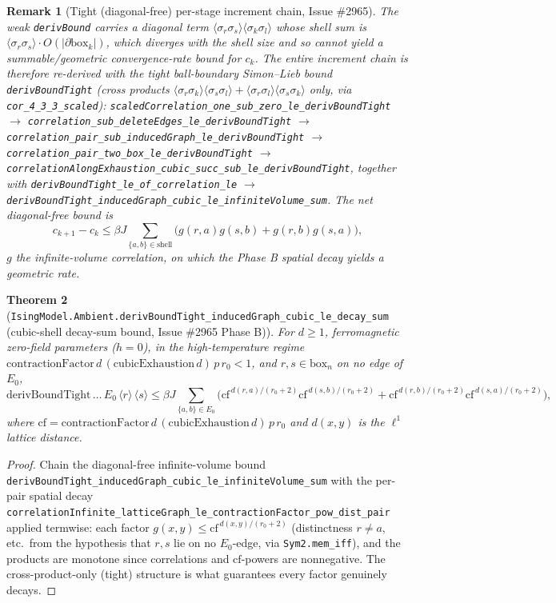 \documentclass[a4paper,11pt]{article}
\newtheorem{theorem}{Theorem}
\newtheorem{remark}[theorem]{Remark}
\begin{document}
\begin{remark}[Tight (diagonal-free) per-stage increment chain, Issue \#2965]
The weak \texttt{derivBound} carries a diagonal term
$\langle\sigma_r\sigma_s\rangle\langle\sigma_k\sigma_l\rangle$ whose shell sum is
$\langle\sigma_r\sigma_s\rangle\cdot O(|\partial\mathrm{box}_k|)$, which
\emph{diverges} with the shell size and so cannot yield a summable/geometric
convergence-rate bound for $c_k$. The entire increment chain is therefore
re-derived with the \emph{tight} ball-boundary
Simon--Lieb bound \texttt{derivBoundTight} (cross products
$\langle\sigma_r\sigma_k\rangle\langle\sigma_s\sigma_l\rangle
+\langle\sigma_r\sigma_l\rangle\langle\sigma_s\sigma_k\rangle$ only, via
\texttt{cor\_4\_3\_3\_scaled}):
\texttt{scaledCorrelation\_one\_sub\_zero\_le\_derivBoundTight}
$\to$ \texttt{correlation\_sub\_deleteEdges\_le\_derivBoundTight}
$\to$ \texttt{correlation\_pair\_sub\_inducedGraph\_le\_derivBoundTight}
$\to$ \texttt{correlation\_pair\_two\_box\_le\_derivBoundTight}
$\to$ \texttt{correlationAlongExhaustion\_cubic\_succ\_sub\_le\_derivBoundTight},
together with \texttt{derivBoundTight\_le\_of\_correlation\_le}
$\to$ \texttt{derivBoundTight\_inducedGraph\_cubic\_le\_infiniteVolume\_sum}. The
net diagonal-free bound is
\[
  c_{k+1}-c_k \le \beta J\sum_{\{a,b\}\in\text{shell}}
    \bigl(g(r,a)g(s,b)+g(r,b)g(s,a)\bigr),
\]
$g$ the infinite-volume correlation, on which the Phase B spatial decay yields a
geometric rate.
\end{remark}

\begin{theorem}[\texttt{IsingModel.Ambient.derivBoundTight\_inducedGraph\_cubic\_le\_decay\_sum}
(cubic-shell decay-sum bound, Issue \#2965 Phase B)]
For $d\ge1$, ferromagnetic zero-field parameters ($h=0$), in the
high-temperature regime
$\mathrm{contractionFactor}\,d\,(\mathrm{cubicExhaustion}\,d)\,p\,r_0<1$, and
$r,s\in\mathrm{box}_n$ on no edge of $E_0$,
\[
  \mathrm{derivBoundTight}\,\dots\,E_0\,\langle r\rangle\,\langle s\rangle
  \le \beta J\!\!\sum_{\{a,b\}\in E_0}\!\!\bigl(\mathrm{cf}^{\,d(r,a)/(r_0+2)}\mathrm{cf}^{\,d(s,b)/(r_0+2)}
    +\mathrm{cf}^{\,d(r,b)/(r_0+2)}\mathrm{cf}^{\,d(s,a)/(r_0+2)}\bigr),
\]
where $\mathrm{cf}=\mathrm{contractionFactor}\,d\,(\mathrm{cubicExhaustion}\,d)\,p\,r_0$
and $d(x,y)$ is the $\ell^1$ lattice distance.
\end{theorem}

\begin{proof}
Chain the diagonal-free infinite-volume bound
\texttt{derivBoundTight\_inducedGraph\_cubic\_le\_infiniteVolume\_sum} with the
per-pair spatial decay
\texttt{correlationInfinite\_latticeGraph\_le\_contractionFactor\_pow\_dist\_pair}
applied termwise: each factor $g(x,y)\le\mathrm{cf}^{\,d(x,y)/(r_0+2)}$ (distinctness
$r\neq a$, etc.\ from the hypothesis that $r,s$ lie on no $E_0$-edge, via
\texttt{Sym2.mem\_iff}), and the products are monotone since correlations and
$\mathrm{cf}$-powers are nonnegative. The cross-product-only (tight) structure is
what guarantees every factor genuinely decays.
\end{proof}
\end{document}
